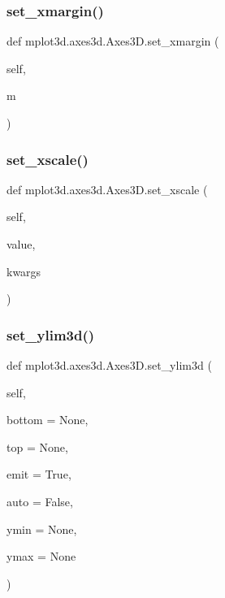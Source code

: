 \begin{DoxyVerb}
\subsubsection{\texorpdfstring{set\+\_\+xmargin()}{set\_xmargin()}}
{\footnotesize\ttfamily def mplot3d.\+axes3d.\+Axes3\+D.\+set\+\_\+xmargin (\begin{DoxyParamCaption}\item[{}]{self,  }\item[{}]{m }\end{DoxyParamCaption})}

\mbox{\label{classmplot3d_1_1axes3d_1_1Axes3D_aea5939cbe30af95c2a5ed7b96cbad890}} 
\subsubsection{\texorpdfstring{set\+\_\+xscale()}{set\_xscale()}}
{\footnotesize\ttfamily def mplot3d.\+axes3d.\+Axes3\+D.\+set\+\_\+xscale (\begin{DoxyParamCaption}\item[{}]{self,  }\item[{}]{value,  }\item[{}]{kwargs }\end{DoxyParamCaption})}

\mbox{\label{classmplot3d_1_1axes3d_1_1Axes3D_a47e4806a72910ce25c0ce20446a123d1}} 
\subsubsection{\texorpdfstring{set\+\_\+ylim3d()}{set\_ylim3d()}}
{\footnotesize\ttfamily def mplot3d.\+axes3d.\+Axes3\+D.\+set\+\_\+ylim3d (\begin{DoxyParamCaption}\item[{}]{self,  }\item[{}]{bottom = {\ttfamily None},  }\item[{}]{top = {\ttfamily None},  }\item[{}]{emit = {\ttfamily True},  }\item[{}]{auto = {\ttfamily False},  }\item[{}]{ymin = {\ttfamily None},  }\item[{}]{ymax = {\ttfamily None} }\end{DoxyParamCaption})}


\end{DoxyVerb}
